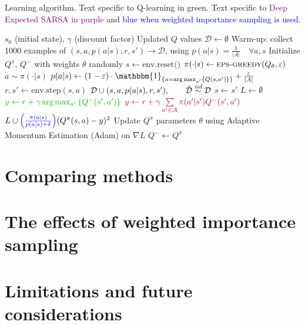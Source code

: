 \documentclass{article}
\begin{document}
\begin{algorithm}
    \caption{Learning algorithm. Text specific to \textcolor{dgreen}{Q-learning in green}. Text specific to \textcolor{purple}{Deep Expected SARSA in purple} and \textcolor{blue}{blue when weighted importance sampling is used}.}
    \begin{algorithmic}
        \Require $s_0$ (initial state), $\gamma$ (discount factor)
        \Ensure Updated $Q$ values
        \State \(\mathcal{D} \gets \emptyset\)
        \State Warm-up: collect 1000 examples of $(s, a, p(a|s), r, s') \rightarrow \mathcal{D}$, using $p(a|s) = \frac{1}{|A|} \quad \forall a, s$
        \State Initialize $Q^\pi$, $Q^-$ with weights \(\theta\) randomly
            \State $s \gets \text{env.reset()}$
                \State $\pi(\cdot | s) \gets \Call{eps-greedy}{Q_\theta, \eps}$
                \State $a \sim \pi(\cdot|s)$
                \State $p(a|s) \gets (1 - \eps) \cdot \mathbbm{1}_{\set{a = \arg\max_{a'}\set{Q(s,a')}}} + \frac{\eps}{|A|}$
                \State $r, s' \gets \text{env.step}(s, a)$
                \State $\mathcal{D} \cup (s, a, p(a|s), r, s'),\qquad \tilde{\mathcal{D}} \overset{\textit{iid}}{\sim}\mathcal{D}$
                \State $s \gets s'$
                \State $L \gets \emptyset$
                    \State $\textcolor{dgreen}{y \gets r + \gamma \arg\max_{a'}\set{Q^-(s',a')}}$
                    \State $\textcolor{purple}{y \gets r + \gamma \sum\limits_{a' \in \mathcal{A}} \pi(a' | s') Q^-(s', a')}$
                    \State $L \cup \textcolor{blue}{\left( \frac{\pi(a|s)}{p(a|s) + \delta} \right)} (Q^\pi(s, a) - y)^2$ %
                    \EndFor
                \State Update $Q^\pi$ parameters \(\theta\) using Adaptive Momentum Estimation (Adam) on \(\nabla L\)
                    \State $Q^- \gets Q^\pi$
                \EndIf
            \EndWhile
        \EndFor
    \end{algorithmic}
\end{algorithm}

\section{Comparing methods}
\section{The effects of weighted importance sampling}
\section{Limitations and future considerations}
\end{document}
